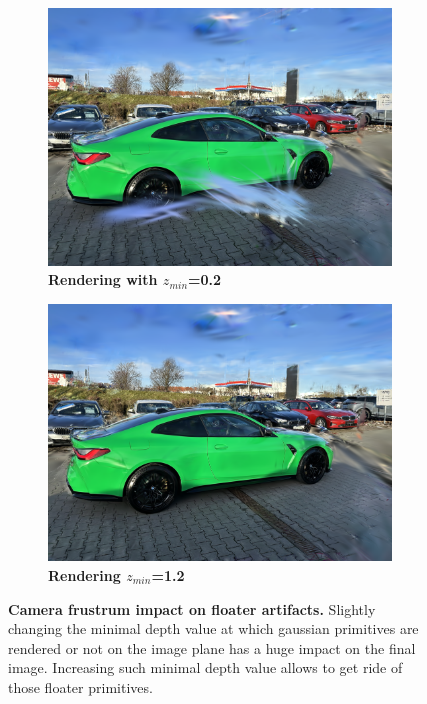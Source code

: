 \begin{figure}[htb!]
  \centering
  \begin{subfigure}[b]{0.45\linewidth}
    \includegraphics[width=\linewidth]{images/gaussiansplatting/needle-artifact.png}
    \caption{\textbf{Rendering with $z_{min}$=0.2} }
  \end{subfigure}
  \quad %
  \begin{subfigure}[b]{0.45\linewidth}
    \includegraphics[width=\linewidth]{images/gaussiansplatting/needle-free-artifact.png}
    \caption{\textbf{Rendering $z_{min}$=1.2} }
  \end{subfigure}
  \caption{\textbf{Camera frustrum impact on floater artifacts.} Slightly changing the minimal depth value at which gaussian primitives are rendered or not on the image plane has a huge impact on the final image. Increasing such minimal depth value allows to get ride of those floater primitives.}
  \label{fig:floater-removed}
\end{figure}

